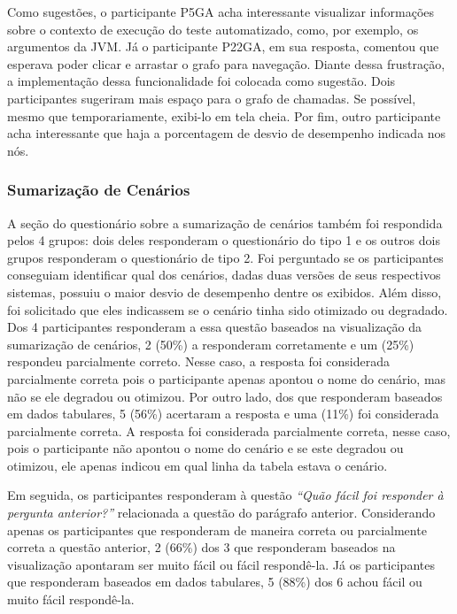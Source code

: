 Como sugestões, o participante P5GA acha interessante visualizar informações sobre o contexto de execução do teste automatizado, como, por exemplo, os argumentos da JVM. Já o participante P22GA, em sua resposta, comentou que esperava poder clicar e arrastar o grafo para navegação. Diante dessa frustração, a implementação dessa funcionalidade foi colocada como sugestão. Dois participantes sugeriram mais espaço para o grafo de chamadas. Se possível, mesmo que temporariamente, exibi-lo em tela cheia. Por fim, outro participante acha interessante que haja a porcentagem de desvio de desempenho indicada nos nós.

\subsubsection{Sumarização de Cenários}

A seção do questionário sobre a sumarização de cenários também foi respondida pelos 4 grupos: dois deles responderam o questionário do tipo 1 e os outros dois grupos responderam o questionário de tipo 2. Foi perguntado se os participantes conseguiam identificar qual dos cenários, dadas duas versões de seus respectivos sistemas, possuiu o maior desvio de desempenho dentre os exibidos. Além disso, foi solicitado que eles indicassem se o cenário tinha sido otimizado ou degradado. Dos 4 participantes responderam a essa questão baseados na visualização da sumarização de cenários, 2 (50\%) a responderam corretamente e um (25\%) respondeu parcialmente correto. Nesse caso, a resposta foi considerada parcialmente correta pois o participante apenas apontou o nome do cenário, mas não se ele degradou ou otimizou. Por outro lado, dos que responderam baseados em dados tabulares, 5 (56\%) acertaram a resposta e uma (11\%) foi considerada parcialmente correta. A resposta foi considerada parcialmente correta, nesse caso, pois o participante não apontou o nome do cenário e se este degradou ou otimizou, ele apenas indicou em qual linha da tabela estava o cenário.

Em seguida, os participantes responderam à questão \textit{``Quão fácil foi responder à pergunta anterior?''} relacionada a questão do parágrafo anterior. Considerando apenas os participantes que responderam de maneira correta ou parcialmente correta a questão anterior, 2 (66\%) dos 3 que responderam baseados na visualização apontaram ser muito fácil ou fácil respondê-la. Já os participantes que responderam baseados em dados tabulares, 5 (88\%) dos 6 achou fácil ou muito fácil respondê-la.

